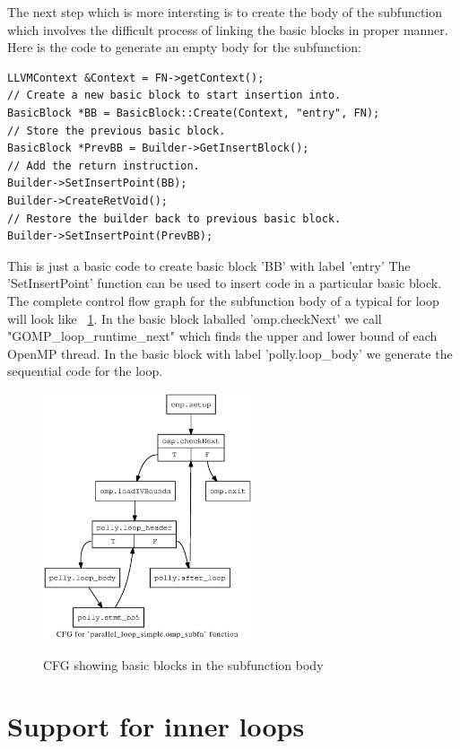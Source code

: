 The next step which is more intersting is to create the body of the subfunction which involves the difficult process of
linking the basic blocks in proper manner. Here is the code to generate an empty body for the subfunction:
{\footnotesize
\begin{lstlisting}
LLVMContext &Context = FN->getContext();
// Create a new basic block to start insertion into.
BasicBlock *BB = BasicBlock::Create(Context, "entry", FN);
// Store the previous basic block.
BasicBlock *PrevBB = Builder->GetInsertBlock();
// Add the return instruction.
Builder->SetInsertPoint(BB);
Builder->CreateRetVoid();
// Restore the builder back to previous basic block.
Builder->SetInsertPoint(PrevBB);
\end{lstlisting}
}
This is just a basic code to create basic block 'BB' with label 'entry' The 'SetInsertPoint' function
can be used to insert code in a particular basic block. The complete control flow graph for the
subfunction body of a typical for loop will look like ~\ref{fig:subfunction_cfg}. In the basic
block laballed 'omp.checkNext' we call "GOMP\_loop\_runtime\_next" which finds the upper and 
lower bound of each OpenMP thread. In the basic block with label 'polly.loop\_body' we
generate the sequential code for the loop.

\begin{figure}
\begin{center}
  \label{fig:subfunction_cfg}
  \includegraphics[width=0.55\textwidth]{images/cfg2.ps}
  \caption{CFG showing basic blocks in the subfunction body}
\end{center}
\end{figure}

\section{Support for inner loops}

